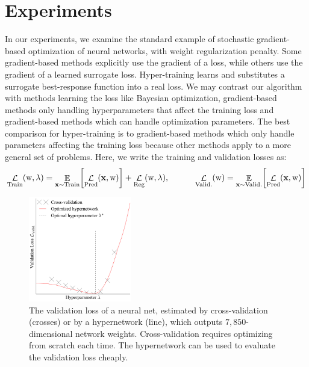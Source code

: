 \documentclass{article} %
\newcommand{\param}{\mathrm{w}} %
\newcommand{\hyper}{\lambda} %
\newcommand{\hyperHyper}{\hyper'} %
\newcommand{\lossSymbol}{\mathop{\mathcal{L}}} %
\newcommand{\lossSymbolInner}{\lossSymbol_{\mathrm{Train}}} %
\newcommand{\lossSymbolOuter}{\lossSymbol_{\mathrm{Valid.}}} %
\newcommand{\innerLoss}[2]{\lossSymbolInner \! \left( #1, #2 \right)} %
\newcommand{\outerLoss}[1]{\lossSymbolOuter \! \left( #1 \right)}%
\newcommand{\predictionLoss}[2]{\lossSymbol_{\mathrm{Pred}} ( #1, #2 )} %
\newcommand{\regLoss}[2]{\lossSymbol_{\mathrm{Reg}} ( #1, #2 )}%
\newcommand{\variableData}{\bf{x}} %
\newcommand{\ETrain}[1]{\mathop{\mathbb{E}}_{\variableData \sim \mathrm{Train}} \! \left[ #1 \right]}
\newcommand{\EValid}[1]{\mathop{\mathbb{E}}_{\variableData \sim \mathrm{Valid.}} \! \left[ #1 \right]}
\newcommand{\innerLossEExpand}[2]{\ETrain{\predictionLoss{\variableData}{#1}} + \regLoss{#1}{#2}} %
\newcommand{\outerLossEExpand}[1]{\EValid{\predictionLoss{\variableData}{#1}}} %
\begin{document}
\section{Experiments}
\label{sec.experiments}
In our experiments, we examine the standard example of stochastic gradient-based optimization of neural networks, with weight regularization penalty.
Some gradient-based methods explicitly use the gradient of a loss, while others use the gradient of a learned surrogate loss.
Hyper-training learns and substitutes a surrogate best-response function into a real loss.
We may contrast our algorithm with methods learning the loss like Bayesian optimization, gradient-based methods only handling hyperparameters that affect the training loss and gradient-based methods which can handle optimization parameters.
The best comparison for hyper-training is to gradient-based methods which only handle parameters affecting the training loss because other methods apply to a more general set of problems.
Here, we write the training and validation losses as:
%
\begin{align*}
\innerLoss{\param}{\hyper} = \innerLossEExpand{\param}{\hyper}, \hspace{0.09\textwidth}
\outerLoss{\param} = \outerLossEExpand{\param}
\end{align*}
%
\begin{figure}
	\vspace{-0.01\textheight}
	\includegraphics[width=0.4\textwidth]{hypernets_global_small.pdf}
	\caption{
	The validation loss of a neural net, estimated by cross-validation (crosses) or by a hypernetwork (line), which outputs $7,850$-dimensional network weights.
	Cross-validation requires optimizing from scratch each time.
	The hypernetwork can be used to evaluate the validation loss cheaply.
	\label{fig:exp1}
	}
\end{figure}
\end{document}
